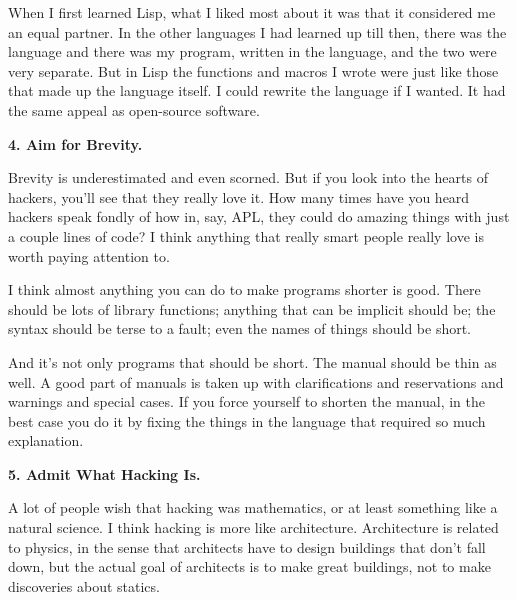 When I first learned
                    Lisp, what I liked most about it was that it considered me
                    an equal partner. In the other languages I had learned up
                    till then, there was the language and there was my program,
                    written in the language, and the two were very separate. But
                    in Lisp the functions and macros I wrote were just like
                    those that made up the language itself. I could rewrite the
                    language if I wanted. It had the same appeal as open-source
                    software.

\textbf{4. Aim for Brevity.}

Brevity is underestimated and even scorned. But
                    if you look into the hearts of hackers, you'll see that they
                    really love it. How many times have you heard hackers speak
                    fondly of how in, say, APL, they could do amazing things
                    with just a couple lines of code? I think anything that
                    really smart people really love is worth paying attention
                    to.

I think almost anything you can do to make
                    programs shorter is good. There should be lots of library
                    functions; anything that can be implicit should be; the
                    syntax should be terse to a fault; even the names of things
                    should be short.

And it's not only programs that
                    should be short. The manual should be thin as well. A good
                    part of manuals is taken up with clarifications and
                    reservations and warnings and special cases. If you force
                    yourself to shorten the manual, in the best case you do it
                    by fixing the things in the language that required so much
                    explanation.

\textbf{5. Admit What Hacking Is.}

A lot of people wish that hacking was
                    mathematics, or at least something like a natural science. I
                    think hacking is more like architecture. Architecture is
                    related to physics, in the sense that architects have to
                    design buildings that don't fall down, but the actual goal
                    of architects is to make great buildings, not to make
                    discoveries about statics.

